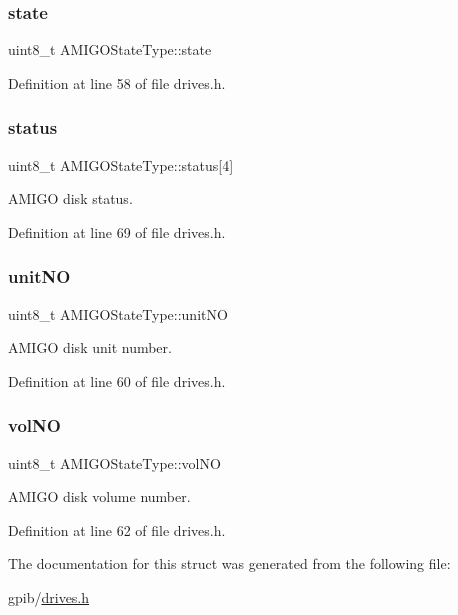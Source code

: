 \subsubsection{\texorpdfstring{state}{state}}
{\footnotesize\ttfamily uint8\+\_\+t A\+M\+I\+G\+O\+State\+Type\+::state}



Definition at line 58 of file drives.\+h.

\mbox{\label{structAMIGOStateType_a20ecb3cbbcb1fe4746c2d38edc125412}} 
\subsubsection{\texorpdfstring{status}{status}}
{\footnotesize\ttfamily uint8\+\_\+t A\+M\+I\+G\+O\+State\+Type\+::status\mbox{[}4\mbox{]}}



A\+M\+I\+GO disk status. 



Definition at line 69 of file drives.\+h.

\mbox{\label{structAMIGOStateType_a3d0cc02f8822c817feddf93dd08a5034}} 
\subsubsection{\texorpdfstring{unit\+NO}{unitNO}}
{\footnotesize\ttfamily uint8\+\_\+t A\+M\+I\+G\+O\+State\+Type\+::unit\+NO}



A\+M\+I\+GO disk unit number. 



Definition at line 60 of file drives.\+h.

\mbox{\label{structAMIGOStateType_a9825e282ac5844225a43b7f0835da67f}} 
\subsubsection{\texorpdfstring{vol\+NO}{volNO}}
{\footnotesize\ttfamily uint8\+\_\+t A\+M\+I\+G\+O\+State\+Type\+::vol\+NO}



A\+M\+I\+GO disk volume number. 



Definition at line 62 of file drives.\+h.



The documentation for this struct was generated from the following file\+:\begin{DoxyCompactItemize}
\item 
gpib/\hyperlink{drives_8h}{drives.\+h}\end{DoxyCompactItemize}
